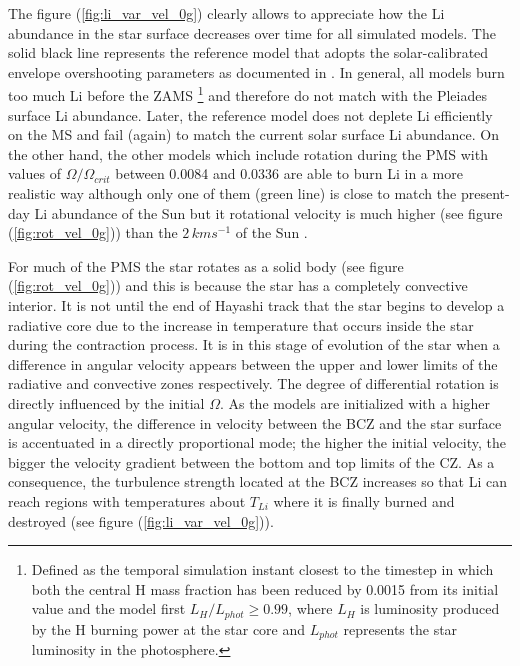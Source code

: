 \documentclass[fleqn,usenatbib]{mnras}
\begin{document}
The figure (\ref{fig:li_var_vel_0g}) clearly allows to appreciate how the Li abundance in the star surface decreases over time for all simulated models. The solid black line represents the reference model that adopts the solar-calibrated envelope overshooting parameters as documented in \citet{Choi2016}. In general, all models burn too much Li before the ZAMS \footnote{Defined as the temporal simulation instant closest to the timestep in which both the central H mass fraction has been reduced by 0.0015 from its initial value and the model first $L_H/L_{phot} \geq 0.99$, where $L_{H}$ is luminosity produced by the H burning power at the star core and $L_{phot}$ represents the star luminosity in the photosphere.} and therefore do not match with the Pleiades surface Li abundance. Later, the reference model does not deplete Li efficiently on the MS and fail (again) to match the current solar surface Li abundance. On the other hand, the other models which include rotation during the PMS with values of $\Omega / \Omega_{crit}$ between 0.0084 and 0.0336 are able to burn Li in a more realistic way although only one of them (green line) is close to match the present-day Li abundance of the Sun but it rotational velocity is much higher (see figure (\ref{fig:rot_vel_0g})) than the $2\,kms^{-1}$ of the Sun \citep{Gill2012}. \par

For much of the PMS the star rotates as a solid body (see figure (\ref{fig:rot_vel_0g})) and this is because the star has a completely convective interior. It is not until the end of Hayashi track that the star begins to develop a radiative core due to the increase in temperature that occurs inside the star during the contraction process. It is in this stage of evolution of the star when a difference in angular velocity appears between the upper and lower limits of the radiative and convective zones respectively. The degree of differential rotation is directly influenced by the initial $\Omega$. As the models are initialized with a higher angular velocity, the difference in velocity between the BCZ and the star surface is accentuated in a directly proportional mode; the higher the initial velocity, the bigger the velocity gradient between the bottom and top limits of the CZ. As a consequence, the turbulence strength located at the BCZ increases so that Li can reach regions with temperatures about $T_{Li}$ where it is finally burned and destroyed (see figure (\ref{fig:li_var_vel_0g})). 
\end{document}

